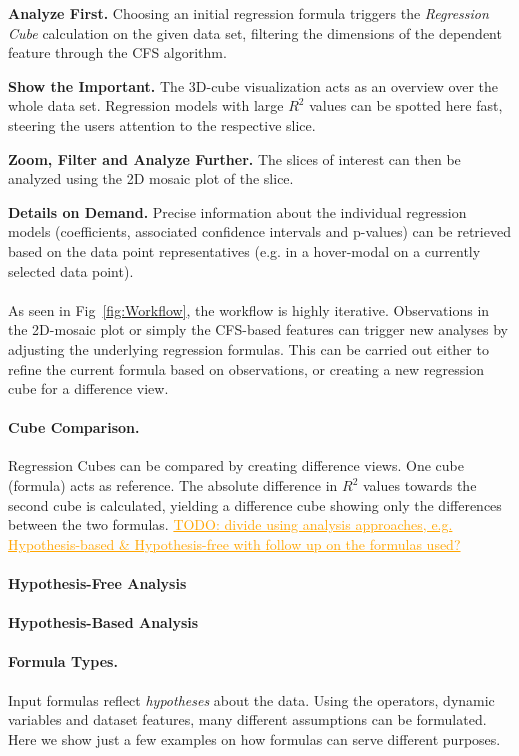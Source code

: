\documentclass[journal]{style/vgtc} 			          %
\newcommand{\com}[1]{\textcolor{orange}{\uline{#1}}}
\begin{document}
\textbf{Analyze First.} Choosing an initial regression formula triggers the \emph{Regression Cube} calculation on the given data set, filtering the dimensions of the dependent feature through the CFS algorithm.

\textbf{Show the Important.} The 3D-cube visualization acts as an overview over the whole data set.
Regression models with large $R^2$ values can be spotted here fast, steering the users attention to the respective slice.

\textbf{Zoom, Filter and Analyze Further.} The slices of interest can then be analyzed using the 2D mosaic plot of the slice.

\textbf{Details on Demand.} Precise information about the individual regression models (coefficients, associated confidence intervals and p-values) can be retrieved based on the data point representatives (e.g. in a hover-modal on a currently selected data point).
\\\\
As seen in Fig~\ref{fig:Workflow}, the workflow is highly iterative.
Observations in the 2D-mosaic plot or simply the CFS-based features can trigger new analyses by adjusting the underlying regression formulas.
This can be carried out either to refine the current formula based on observations, or creating a new regression cube for a difference view.
\paragraph{Cube Comparison.}
Regression Cubes can be compared by creating difference views.
One cube (formula) acts as reference.
The absolute difference in $R^2$ values towards the second cube is calculated, yielding a difference cube showing only the differences between the two formulas.
\com{TODO: divide using analysis approaches, e.g. Hypothesis-based \& Hypothesis-free with follow up on the formulas used?}
\paragraph{Hypothesis-Free Analysis}
\paragraph{Hypothesis-Based Analysis}
\paragraph{Formula Types.}
Input formulas reflect \emph{hypotheses} about the data.
Using the operators, dynamic variables and dataset features, many different assumptions can be formulated.
Here we show just a few examples on how formulas can serve different purposes.
\end{document}

